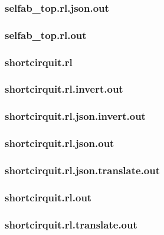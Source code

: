 \subsubsection{selfab\_top.rl.json.out}
\label{app:selfab_top_rl.json.out}

\subsubsection{selfab\_top.rl.out}
\label{app:selfab_top_rl.out}

\subsubsection{shortcirquit.rl}
\label{app:shortcirquit_rl}

\subsubsection{shortcirquit.rl.invert.out}
\label{app:shortcirquit_rl.invert.out}

\subsubsection{shortcirquit.rl.json.invert.out}
\label{app:shortcirquit_rl.json.invert.out}

\subsubsection{shortcirquit.rl.json.out}
\label{app:shortcirquit_rl.json.out}

\subsubsection{shortcirquit.rl.json.translate.out}
\label{app:shortcirquit_rl.json.translate.out}

\subsubsection{shortcirquit.rl.out}
\label{app:shortcirquit_rl.out}

\subsubsection{shortcirquit.rl.translate.out}
\label{app:shortcirquit_rl.translate.out}

